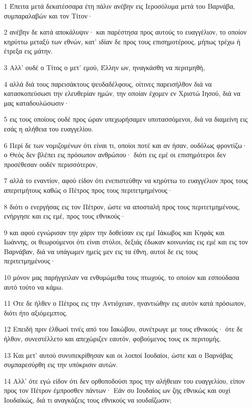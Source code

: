 \par 1 Έπειτα μετά δεκατέσσαρα έτη πάλιν ανέβην εις Ιεροσόλυμα μετά του Βαρνάβα, συμπαραλαβών και τον Τίτον·
\par 2 ανέβην δε κατά αποκάλυψιν· και παρέστησα προς αυτούς το ευαγγέλιον, το οποίον κηρύττω μεταξύ των εθνών, κατ' ιδίαν δε προς τους επισημοτέρους, μήπως τρέχω ή έτρεξα εις μάτην.
\par 3 Αλλ' ουδέ ο Τίτος ο μετ' εμού, Έλλην ων, ηναγκάσθη να περιτμηθή,
\par 4 αλλά διά τους παρεισάκτους ψευδαδέλφους, οίτινες παρεισήλθον διά να κατασκοπεύσωσι την ελευθερίαν ημών, την οποίαν έχομεν εν Χριστώ Ιησού, διά να μας καταδουλώσωσιν·
\par 5 εις τους οποίους ουδέ προς ώραν υπεχωρήσαμεν υποτασσόμενοι, διά να διαμείνη εις εσάς η αλήθεια του ευαγγελίου.
\par 6 Περί δε των νομιζομένων ότι είναι τι, οποίοι ποτέ και αν ήσαν, ουδόλως φροντίζω· ο Θεός δεν βλέπει εις πρόσωπον ανθρώπου· διότι εις εμέ οι επισημότεροι δεν προσέθεσαν ουδέν περισσότερον,
\par 7 αλλά το εναντίον, αφού είδον ότι ενεπιστεύθην να κηρύττω το ευαγγέλιον προς τους απεριτμήτους καθώς ο Πέτρος προς τους περιτετμημένους·
\par 8 διότι ο ενεργήσας εις τον Πέτρον, ώστε να αποσταλή προς τους περιτετμημένους, ενήργησε και εις εμέ, προς τους εθνικούς·
\par 9 και αφού εγνώρισαν την χάριν την δοθείσαν εις εμέ Ιάκωβος και Κηφάς και Ιωάννης, οι θεωρούμενοι ότι είναι στύλοι, δεξιάς έδωκαν κοινωνίας εις εμέ και εις τον Βαρνάβαν, διά να υπάγωμεν ημείς μεν εις τα έθνη, αυτοί δε εις τους περιτετμημένους·
\par 10 μόνον μας παρήγγειλαν να ενθυμώμεθα τους πτωχούς, το οποίον και εσπούδασα αυτό τούτο να κάμω.
\par 11 Ότε δε ήλθεν ο Πέτρος εις την Αντιόχειαν, ηναντιώθην εις αυτόν κατά πρόσωπον, διότι ήτο αξιόμεμπτος.
\par 12 Επειδή πριν έλθωσί τινές από του Ιακώβου, συνέτρωγε με τους εθνικούς· ότε δε ήλθον, συνεστέλλετο και απεχώριζεν εαυτόν, φοβούμενος τους εκ περιτομής.
\par 13 Και μετ' αυτού συνυπεκρίθησαν και οι λοιποί Ιουδαίοι, ώστε και ο Βαρνάβας συμπαρεσύρθη εις την υπόκρισιν αυτών.
\par 14 Αλλ' ότε εγώ είδον ότι δεν ορθοποδούσι προς την αλήθειαν του ευαγγελίου, είπον προς τον Πέτρον έμπροσθεν πάντων· Εάν συ Ιουδαίος ων ζης εθνικώς και ουχί Ιουδαϊκώς, διά τι αναγκάζεις τους εθνικούς να ιουδαΐζωσιν;
